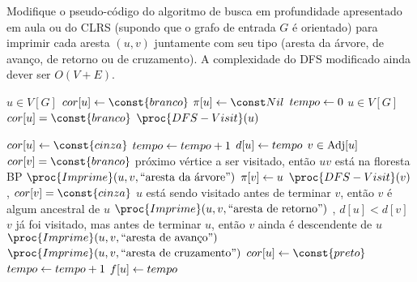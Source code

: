 Modifique o pseudo-código do algoritmo de busca em profundidade apresentado em aula ou do CLRS (supondo que o grafo de entrada $G$ é orientado) para imprimir cada aresta $(u, v)$ juntamente com seu tipo (aresta da árvore, de avanço, de retorno ou de cruzamento). A complexidade do DFS modificado ainda dever ser $O(V + E)$.

\itemdsep

\newcommand{\Branco}{\const{branco}\xspace}
\newcommand{\Cinza}{\const{cinza}\xspace}
\newcommand{\Preto}{\const{preto}\xspace}

\begin{codebox}
\li \Para \Cada $u \in V[G]$ \Faca
    \Do
\li     $cor[u] \Recebe \Branco$
\li     $\pi[u] \Recebe \Nulo$
    \End
\li $tempo \leftarrow 0$
\li \Para \Cada $u \in V[G]$ \Faca
    \Do
\li     \Se $cor[u] = \Branco$
        \Do
\li         \Entao $\proc{DFS-Visit}(u)$
        \End
    \End
\end{codebox}

\begin{codebox}
\li $cor[u] \Recebe \Cinza$
\li $tempo \leftarrow tempo + 1$
\li $d[u] \leftarrow tempo$
\li \Para \Cada $v \in \operatorname{Adj}[u]$
    \Do
\li     \Se $cor[v] = \Branco$ \Entao
\li     \Comment próximo vértice a ser visitado, então $uv$ está na floresta BP
        \Do
\li         $\proc{Imprime}(u, v, \text{``aresta da árvore''})$
\li
\li         $\pi[v] \leftarrow u$
\li         $\proc{DFS-Visit}(v)$
        \End
\li     \Senao, \Se $cor[v] = \Cinza$ \Entao
\li     \Comment $u$ está sendo visitado antes de terminar $v$, então $v$ é algum ancestral de $u$
        \Do
\li         $\proc{Imprime}(u, v, \text{``aresta de retorno''})$
        \End
\li     \Senao, \Se $d[u] < d[v]$ \Entao
\li     \Comment $v$ já foi visitado, mas antes de terminar $u$, então $v$ ainda é descendente de $u$
        \Do
\li         $\proc{Imprime}(u, v, \text{``aresta de avanço''})$
        \End
\li     \Senao
        \Do
\li         $\proc{Imprime}(u, v, \text{``aresta de cruzamento''})$
        \End
    \End
\li $cor[u] \Recebe \Preto$
\li $tempo \leftarrow tempo + 1$
\li $f[u] \leftarrow tempo$
\end{codebox}

